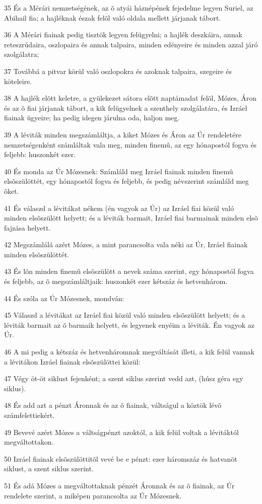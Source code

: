 \par 35 És a Mérári nemzetségének, az õ atyái háznépének fejedelme legyen Suriel, az Abihail fia; a hajléknak észak felõl való oldala mellett járjanak tábort.
\par 36 A Mérári fiainak pedig tisztök legyen felügyelni; a hajlék deszkáira, annak reteszrúdaira, oszlopaira és annak talpaira, minden edényeire és minden azzal járó szolgálatra;
\par 37 Továbbá a pitvar körül való oszlopokra és azoknak talpaira, szegeire és köteleire.
\par 38 A hajlék elõtt keletre, a gyülekezet sátora elõtt naptámadat felõl, Mózes, Áron és az õ fiai járjanak tábort, a kik felügyelnek a szenthely szolgálatára, és Izráel fiainak ügyeire; ha pedig idegen járulna oda, haljon meg.
\par 39 A léviták minden megszámláltja, a kiket Mózes és Áron az Úr rendeletére nemzetségenként számláltak vala meg, minden finemû, az egy hónapostól fogva és feljebb: huszonkét ezer.
\par 40 És monda az Úr Mózesnek: Számláld meg Izráel fiainak minden finemû elsõszülöttét, egy hónapostól fogva és feljebb, és pedig névszerint számláld meg õket.
\par 41 És válaszd a lévitákat nékem (én vagyok az Úr) az Izráel fiai közül való minden elsõszülött helyett; és a léviták barmait, Izráel fiai barmainak minden elsõ fajzása helyett.
\par 42 Megszámlálá azért Mózes, a mint parancsolta vala néki az Úr, Izráel fiainak minden elsõszülöttét.
\par 43 És lõn minden finemû elsõszülött a nevek száma szerint, egy hónapostól fogva és feljebb, az õ megszámláltjaik: huszonkét ezer kétszáz és hetvenhárom.
\par 44 És szóla az Úr Mózesnek, mondván:
\par 45 Válaszd a lévitákat az Izráel fiai közül való minden elsõszülött helyett; és a léviták barmait az õ barmaik helyett, és legyenek enyéim a léviták. Én vagyok az Úr.
\par 46 A mi pedig a kétszáz és hetvenháromnak megváltását illeti, a kik felül vannak a lévitákon Izráel fiainak elsõszülöttei közül:
\par 47 Végy öt-öt siklust fejenként; a szent  siklus szerint vedd azt, (húsz géra egy siklus).
\par 48 És add azt a pénzt Áronnak és az õ fiainak, váltságul a köztök lévõ számfelettiekért.
\par 49 Bevevé azért Mózes a váltságpénzt azoktól, a kik felül voltak a lévitáktól megváltottakon.
\par 50 Izráel fiainak elsõszülöttitõl vevé be e pénzt: ezer háromszáz és hatvanöt siklust, a szent siklus szerint.
\par 51 És adá Mózes a megváltottaknak pénzét Áronnak és az õ fiainak, az Úr rendelete szerint, a miképen parancsolta az Úr Mózesnek.

